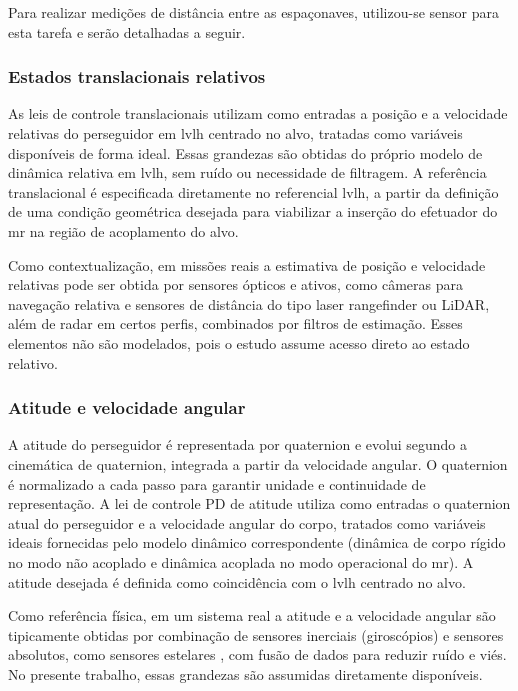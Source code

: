 Para realizar medições de distância entre as espaçonaves, utilizou-se sensor para esta tarefa e serão detalhadas a seguir.

\subsubsection{Estados translacionais relativos}
\label{subsubsec_sensoriamento_translacional}

As leis de controle translacionais utilizam como entradas a posição e a velocidade relativas do perseguidor em \gls{lvlh} centrado no alvo, tratadas como variáveis disponíveis de forma ideal.
Essas grandezas são obtidas do próprio modelo de dinâmica relativa em \gls{lvlh}, sem ruído ou necessidade de filtragem.
A referência translacional é especificada diretamente no referencial \gls{lvlh}, a partir da definição de uma condição geométrica desejada para viabilizar a inserção do efetuador do \gls{mr} na região de acoplamento do alvo.

Como contextualização, em missões reais a estimativa de posição e velocidade relativas pode ser obtida por sensores ópticos e ativos, como câmeras para navegação relativa e sensores de distância do tipo laser \cite{wertz2011sme_smad} rangefinder ou LiDAR, além de radar em certos perfis, combinados por filtros de estimação.
Esses elementos não são modelados, pois o estudo assume acesso direto ao estado relativo.

\subsubsection{Atitude e velocidade angular}
\label{subsubsec_sensoriamento_atitude}

A atitude do perseguidor é representada por quaternion e evolui segundo a cinemática de quaternion, integrada a partir da velocidade angular.
O quaternion é normalizado a cada passo para garantir unidade e continuidade de representação.
A lei de controle PD de atitude utiliza como entradas o quaternion atual do perseguidor e a velocidade angular do corpo, tratados como variáveis ideais fornecidas pelo modelo dinâmico correspondente (dinâmica de corpo rígido no modo não acoplado e dinâmica acoplada no modo operacional do \gls{mr}).
A atitude desejada é definida como coincidência com o \gls{lvlh} centrado no alvo.

Como referência física, em um sistema real a atitude e a velocidade angular são tipicamente obtidas por combinação de sensores inerciais (giroscópios) e sensores absolutos, como sensores estelares \cite{wertz2011sme_smad}, com fusão de dados para reduzir ruído e viés. No presente trabalho, essas grandezas são assumidas diretamente disponíveis.

